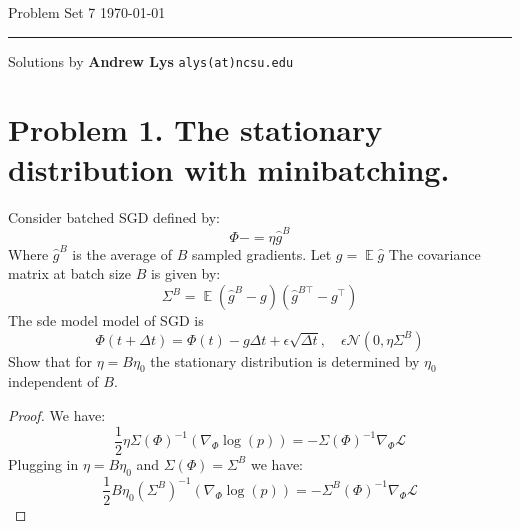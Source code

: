 \documentclass{amsart}
\newcommand{\cN}{\mathcal{N}}
\newcommand{\cL}{\mathcal{L}}
\DeclareMathOperator{\ee}{\mathbb{E}}
\theoremstyle{definition}
\begin{document}
\noindent
Problem Set 7  \hfill \today  %
\smallskip
\hrule
\smallskip
\noindent
Solutions by {\bf Andrew Lys} \qquad   %
  {\tt alys(at)ncsu.edu}

\vspace{0.5cm}

\section*{Problem 1. The stationary distribution with minibatching.}
Consider batched SGD defined by:
\[
\Phi -= \eta \hat{g}^B
\]
Where $\hat{g}^B$ is the average of $B$ sampled gradients. 
Let $g = \ee{\hat{g}}$
The covariance matrix at batch size $B$ is given by:
\[
\Sigma^B = \ee{(\hat{g}^B - g)(\hat{g}^{B\top} - g^\top)}
\]
The sde model model of SGD is 
\[
\Phi(t + \Delta t) = \Phi(t) - g\Delta t + \epsilon \sqrt{\Delta t}, \quad \epsilon \cN(0, \eta \Sigma^B)
\]
Show that for $\eta = B \eta_0$ the stationary distribution is determined by $\eta_0$ independent of $B$. 
\begin{proof}
    We have:
    \[
    \frac{1}{2}\eta \Sigma(\Phi)^{-1}(\nabla_\Phi \log(p)) = - \Sigma(\Phi)^{-1} \nabla_\Phi \cL
    \]
    Plugging in $\eta = B \eta_0$ and $\Sigma(\Phi) = \Sigma^B$ we have:
    \[
    \frac{1}{2}B \eta_0 (\Sigma^B)^{-1}(\nabla_\Phi \log(p)) = - \Sigma^B(\Phi)^{-1} \nabla_\Phi \cL
    \]
\end{proof}
\end{document}
